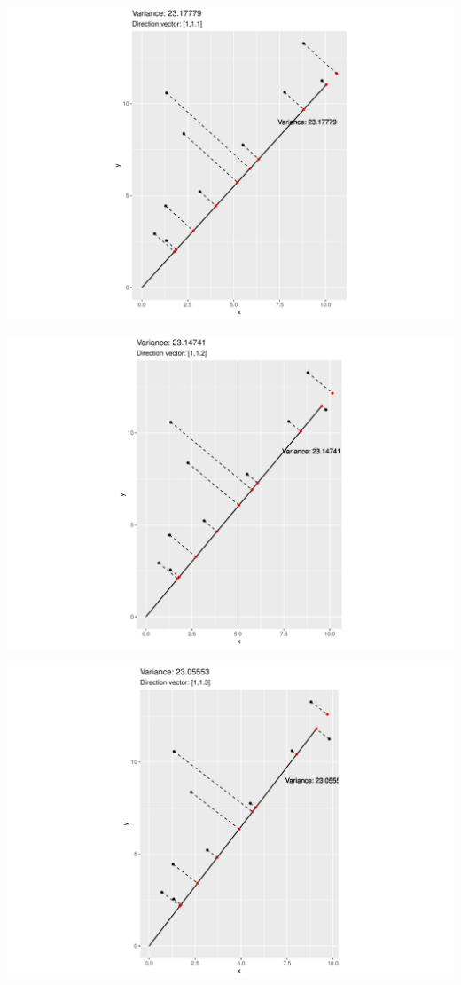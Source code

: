 \documentclass[
  ignorenonframetext,
]{beamer}
\begin{document}
\begin{frame}{}
\protect\hypertarget{section-11}{}
\includegraphics{note9_files/figure-beamer/unnamed-chunk-18-1.pdf}
\end{frame}

\begin{frame}{}
\protect\hypertarget{section-12}{}
\includegraphics{note9_files/figure-beamer/unnamed-chunk-19-1.pdf}
\end{frame}

\begin{frame}{}
\protect\hypertarget{section-13}{}
\includegraphics{note9_files/figure-beamer/unnamed-chunk-20-1.pdf}
\end{frame}
\end{document}
